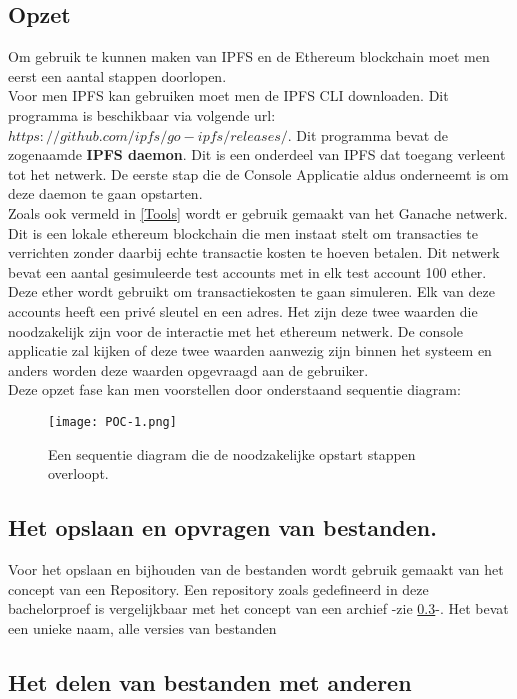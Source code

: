 \subsection{Opzet}
Om gebruik te kunnen maken van IPFS en de Ethereum blockchain moet men eerst een aantal stappen doorlopen.\\

Voor men IPFS kan gebruiken moet men de IPFS CLI downloaden. Dit programma is beschikbaar via volgende url: $https://github.com/ipfs/go-ipfs/releases/$. Dit programma bevat de zogenaamde \textbf{IPFS daemon}. Dit is een onderdeel van IPFS dat toegang verleent tot het netwerk. De eerste stap die de Console Applicatie aldus onderneemt is om deze daemon te gaan opstarten.\\

Zoals ook vermeld in \ref{Tools} wordt er gebruik gemaakt van het Ganache netwerk. Dit is een lokale ethereum blockchain die men instaat stelt om transacties te verrichten zonder daarbij echte transactie kosten te hoeven betalen. Dit netwerk bevat een aantal gesimuleerde test accounts met in elk test account 100 ether. Deze ether wordt gebruikt om transactiekosten te gaan simuleren. Elk van deze accounts heeft een privé sleutel en een adres. Het zijn deze twee waarden die noodzakelijk zijn voor de interactie met het ethereum netwerk. De console applicatie zal kijken of deze twee waarden aanwezig zijn binnen het systeem en anders worden deze waarden opgevraagd aan de gebruiker.\\

Deze opzet fase kan men voorstellen door onderstaand sequentie diagram:

\begin{figure}[h!]
\centering
\texttt{[image: POC-1.png]}
\caption[POC opstart]{Een sequentie diagram die de noodzakelijke opstart stappen overloopt. }
\end{figure}

\subsection{Het opslaan en opvragen van bestanden.}
Voor het opslaan en bijhouden van de bestanden wordt gebruik gemaakt van het concept van een Repository. Een repository zoals gedefineerd in deze bachelorproef is vergelijkbaar met het concept van een archief -zie \ref{}-. Het bevat een unieke naam, alle versies van bestanden 

\subsection{Het delen van bestanden met anderen}

